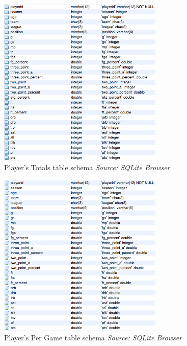 \begin{figure}[h!]
	\begin{center}
		\includegraphics[width=0.7\textwidth]{./images/player_total}
		\caption{Player's Totals table schema \textit{Source: SQLite Browser}}
		\label{fig:411-2}
	\end{center}
\end{figure}

\begin{figure}[h!]
	\begin{center}
		\includegraphics[width=0.7\textwidth]{./images/player_per_game}
		\caption{Player's Per Game table schema \textit{Source: SQLite Browser}}
		\label{fig:411-3}
	\end{center}
\end{figure}

